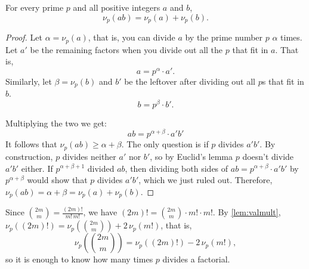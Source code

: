 \documentclass{article}
\begin{document}
\begin{lemma}\label{lem:valmult}
  For every prime $p$ and all positive integers $a$ and $b$,
  \[
    \nu_p(ab) = \nu_p(a) + \nu_p(b).
  \]
\end{lemma}
\begin{proof}
  Let $\alpha = \nu_p(a)$, that is, you can divide $a$ by the prime number $p$ $\alpha$ times. Let $a'$ be the remaining
  factors when you divide out all the $p$ that fit in $a$. That is, 
  \[a = p^\alpha \cdot a'.\]
  Similarly, let $\beta = \nu_p(b)$ and $b'$ be the leftover after dividing out all $p$s that fit in $b$.
  \[b = p^\beta \cdot b'.\]

  Multiplying the two we get:
  \[
    ab = p^{\alpha+\beta} \cdot a'b'
  \]
  It follows that $\nu_p(ab) \geq \alpha + \beta$. The only question is if $p$ divides $a'b'$. By construction,
  $p$ divides neither $a'$ nor $b'$, so by Euclid's lemma $p$ doesn't divide $a'b'$ either.
  If $p^{\alpha+\beta+1}$ divided $ab$, then dividing both sides of $ab = p^{\alpha+\beta} \cdot a'b'$ by
  $p^{\alpha+\beta}$ would show that $p$ divides $a'b'$, which we just ruled out.
  Therefore, $\nu_p(ab) = \alpha + \beta = \nu_p(a) + \nu_p(b)$.
\end{proof}

Since $\binom{2m}{m} = \frac{(2m)!}{m!\,m!}$, we have $(2m)! = \binom{2m}{m} \cdot m! \cdot m!$. By \cref{lem:valmult},
$\nu_p((2m)!) = \nu_p(\binom{2m}{m}) + 2\,\nu_p(m!)$, that is,
\[
  \nu_p\!\left(\binom{2m}{m}\right) = \nu_p((2m)!) - 2\,\nu_p(m!),
\]
so it is enough to know how many times $p$ divides a factorial.
\end{document}

